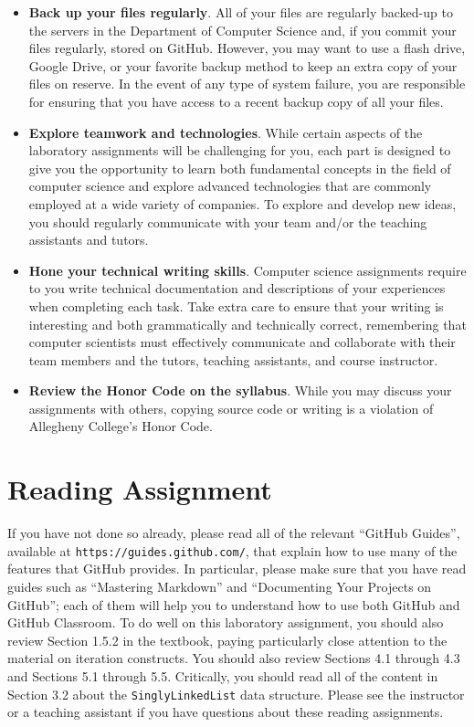 \documentclass[11pt]{article}
\newcommand{\program}[1]{\lstinline{#1}}
\newcommand{\url}[1]{\lstinline{#1}}
\begin{document}
\begin{itemize}
\item {\bf Back up your files regularly}. All of your files are regularly backed-up to the servers in the Department of
  Computer Science and, if you commit your files regularly, stored on GitHub. However, you may want to use a flash
  drive, Google Drive, or your favorite backup method to keep an extra copy of your files on reserve. In the event of
  any type of system failure, you are responsible for ensuring that you have access to a recent backup copy of all your
  files.

\item {\bf Explore teamwork and technologies}. While certain aspects of the laboratory assignments will be challenging
  for you, each part is designed to give you the opportunity to learn both fundamental concepts in the field of computer
  science and explore advanced technologies that are commonly employed at a wide variety of companies. To explore and
  develop new ideas, you should regularly communicate with your team and/or the teaching assistants and tutors.

\item {\bf Hone your technical writing skills}. Computer science assignments require to you write technical
  documentation and descriptions of your experiences when completing each task. Take extra care to ensure that your
  writing is interesting and both grammatically and technically correct, remembering that computer scientists must
  effectively communicate and collaborate with their team members and the tutors, teaching assistants, and course
  instructor.

\item {\bf Review the Honor Code on the syllabus}. While you may discuss your assignments with others, copying source
  code or writing is a violation of Allegheny College's Honor Code.

\end{itemize}

\section*{Reading Assignment}

If you have not done so already, please read all of the relevant ``GitHub
Guides'', available at \url{https://guides.github.com/}, that explain how to use
many of the features that GitHub provides. In particular, please make sure that
you have read guides such as ``Mastering Markdown'' and ``Documenting Your
Projects on GitHub''; each of them will help you to understand how to use both
GitHub and GitHub Classroom. To do well on this laboratory assignment, you
should also review Section 1.5.2 in the textbook, paying particularly close
attention to the material on iteration constructs. You should also review
Sections 4.1 through 4.3 and Sections 5.1 through 5.5. Critically, you should
read all of the content in Section 3.2 about the \program{SinglyLinkedList} data
structure. Please see the instructor or a teaching assistant if you have
questions about these reading assignments.
\end{document}
